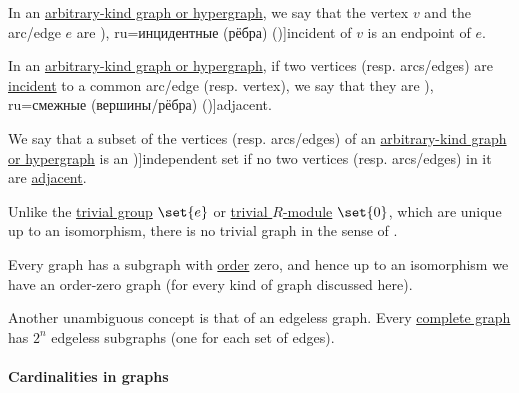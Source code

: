 \begin{definition}\label{def:graph_incidence}
  In an \hyperref[rem:arbitrary_kind_graph]{arbitrary-kind graph or hypergraph}, we say that the vertex \( v \) and the arc/edge \( e \) are \term[bg=инцидентни (ребра) (\cite[7]{Мирчев2001Графи}), ru=инцидентные (рёбра) (\cite[9]{Емеличев1990Графы})]{incident} of \( v \) is an endpoint of \( e \).
\end{definition}

\begin{definition}\label{def:graph_adjacency}
  In an \hyperref[rem:arbitrary_kind_graph]{arbitrary-kind graph or hypergraph}, if two vertices (resp. arcs/edges) are \hyperref[def:graph_incidence]{incident} to a common arc/edge (resp. vertex), we say that they are \term[bg=съседни (върхове/дъги/ребра) (\cite[7]{Мирчев2001Графи}), ru=смежные (вершины/рёбра) (\cite[9]{Емеличев1990Графы})]{adjacent}.
\end{definition}

\begin{definition}\label{def:graph_independent_set}
  We say that a subset of the vertices (resp. arcs/edges) of an \hyperref[rem:arbitrary_kind_graph]{arbitrary-kind graph or hypergraph} is an \term[bg=независимо множество (\cite[103]{Мирчев2001Графи})]{independent set} if no two vertices (resp. arcs/edges) in it are \hyperref[def:graph_adjacency]{adjacent}.
\end{definition}

\begin{remark}\label{rem:trivial_graph}
  Unlike the \hyperref[def:group/trivial]{trivial group} \( \set{ e } \) or \hyperref[def:module/trivial]{trivial \( R \)-module} \( \set{ 0 } \), which are unique up to an isomorphism, there is no trivial graph in the sense of .

  Every graph has a subgraph with \hyperref[def:graph_cardinality/order]{order} zero, and hence up to an isomorphism we have an order-zero graph (for every kind of graph discussed here).

  Another unambiguous concept is that of an edgeless graph. Every \hyperref[def:complete_graph]{complete graph} has \( 2^n \) edgeless subgraphs (one for each set of edges).
\end{remark}

\paragraph{Cardinalities in graphs}

